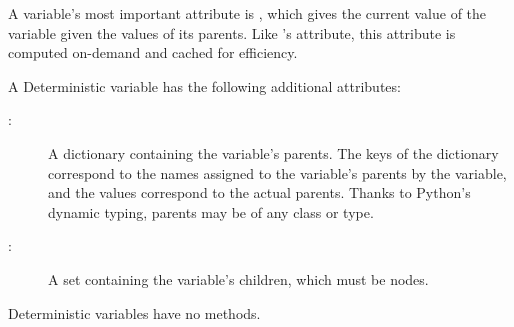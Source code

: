 A  variable's most important attribute is , which gives the current value of the variable given the values of its parents. Like 's  attribute, this attribute is computed on-demand and cached for efficiency.

A Deterministic variable has the following additional attributes:
\begin{description}
    \item[:] A dictionary containing the variable's parents. The keys of the dictionary correspond to the names assigned to the variable's parents by the variable, and the values correspond to the actual parents. Thanks to Python's dynamic typing, parents may be of any class or type.
    \item[:] A set containing the variable's children, which must be nodes.
\end{description}
Deterministic variables have no methods.


